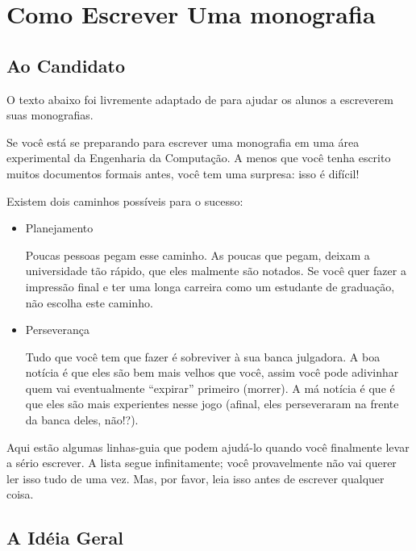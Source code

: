 \chapter {Como Escrever Uma monografia}
\label{cap:como escrever uma monografia}

\section{Ao Candidato}

O texto abaixo foi livremente adaptado de \cite{COMER2010} para ajudar os alunos a escreverem suas monografias. 

Se você está se preparando para escrever uma monografia em uma área experimental da Engenharia da Computação. 
A menos que você tenha escrito muitos documentos formais antes, você tem uma surpresa: isso é difícil!

Existem dois caminhos possíveis para o sucesso:

\begin{itemize}
	\item Planejamento
	
	Poucas pessoas pegam esse caminho. As poucas que pegam, deixam a universidade tão rápido, 
	que eles malmente são notados. Se você quer fazer a impressão final e ter uma longa carreira como um 
	estudante de graduação, não escolha este caminho.
	
	\item Perseverança
	
	Tudo que você tem que fazer é sobreviver à sua banca julgadora. 
	A boa notícia é que eles são bem mais velhos que você, assim você pode adivinhar quem vai eventualmente 
	``expirar''  primeiro (morrer).
	A má notícia é que é que eles são mais experientes nesse jogo (afinal, eles perseveraram na frente da banca deles, não!?).
	
\end{itemize}
	
Aqui estão algumas linhas-guia que podem ajudá-lo quando você finalmente levar a sério escrever. 
A lista segue infinitamente; você provavelmente não vai querer ler isso tudo de uma vez. Mas, por favor, leia isso antes de 
escrever qualquer coisa.

\hfill

\section{A Idéia Geral}	

